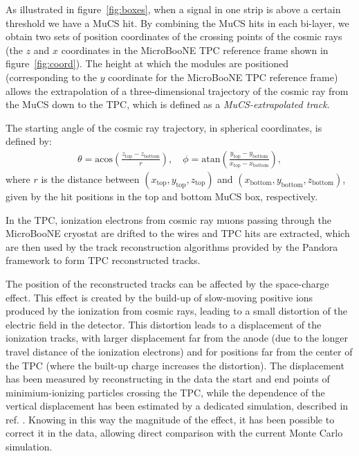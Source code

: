 \documentclass[a4paper,11pt]{article}
\begin{document}
As illustrated in figure~\ref{fig:boxes}, when a signal in one strip is above a certain threshold we have a MuCS hit. By combining the MuCS hits in each bi-layer, we obtain two sets of position coordinates of the crossing points of the cosmic rays (the $z$ and $x$ coordinates in the MicroBooNE TPC reference frame shown in figure~\ref{fig:coord}). The height at which the modules are positioned (corresponding to the $y$ coordinate for the MicroBooNE TPC reference frame) allows the extrapolation of a three-dimensional trajectory of the cosmic ray from the MuCS down to the TPC, which is defined as a \emph{MuCS-extrapolated track}.

The starting angle of the cosmic ray trajectory, in spherical coordinates, is defined by:
\begin{align}\label{eq:angles_mucs}
  \theta = \mathrm{acos}\left(\frac{z_{\mathrm{top}}-z_{\mathrm{bottom}}}{r}\right), \quad
  \phi = \mathrm{atan}\left(\frac{y_{\mathrm{top}}-y_{\mathrm{bottom}}}{x_{\mathrm{top}}-x_{\mathrm{bottom}}}\right),
\end{align}
where $r$ is the distance between $(x_{\mathrm{top}},y_{\mathrm{top}},z_{\mathrm{top}})$ and $(x_{\mathrm{bottom}},y_{\mathrm{bottom}},z_{\mathrm{bottom}})$, given by the hit positions in the top and bottom MuCS box, respectively.

In the TPC, ionization electrons from cosmic ray muons passing through the MicroBooNE cryostat are drifted to the wires and TPC hits are extracted, which are then used by the track reconstruction algorithms provided by the Pandora framework \cite{pandora} to form TPC reconstructed tracks.

The position of the reconstructed tracks can be affected by the space-charge effect. This effect is created by the build-up of slow-moving positive ions produced by the ionization from cosmic rays, leading to a small distortion of the electric field in the detector. This distortion leads to a displacement of the ionization tracks, with larger displacement far from the anode (due to the longer travel distance of the ionization electrons) and for positions far from the center of the TPC (where the built-up charge increases the distortion). The displacement has been measured by reconstructing in the data the start and end points of minimium-ionizing particles crossing the TPC, while the dependence of the vertical displacement has been estimated by a dedicated simulation, described in ref. \cite{spacecharge}. Knowing in this way the magnitude of the effect, it has been possible to correct it in the data, allowing direct comparison with the current Monte Carlo simulation.
\end{document}
